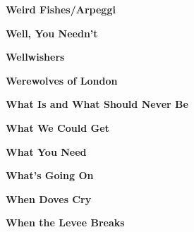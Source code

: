 \vspace{10pt} 
\begin{center}\textbf{Weird Fishes/Arpeggi}\end{center}
\newline
\vspace{10pt} 
\begin{center}\textbf{Well, You Needn't}\end{center}
\newline
\vspace{10pt} 
\begin{center}\textbf{Wellwishers}\end{center}
\newline
\vspace{10pt} 
\begin{center}\textbf{Werewolves of London}\end{center}
\newline
\vspace{10pt} 
\begin{center}\textbf{What Is and What Should Never Be}\end{center}
\newline
\vspace{10pt} 
\begin{center}\textbf{What We Could Get}\end{center}
\newline
\vspace{10pt} 
\begin{center}\textbf{What You Need}\end{center}
\newline
\vspace{10pt} 
\begin{center}\textbf{What's Going On}\end{center}
\newline
\vspace{10pt} 
\begin{center}\textbf{When Doves Cry}\end{center}
\newline
\vspace{10pt} 
\begin{center}\textbf{When the Levee Breaks}\end{center}
